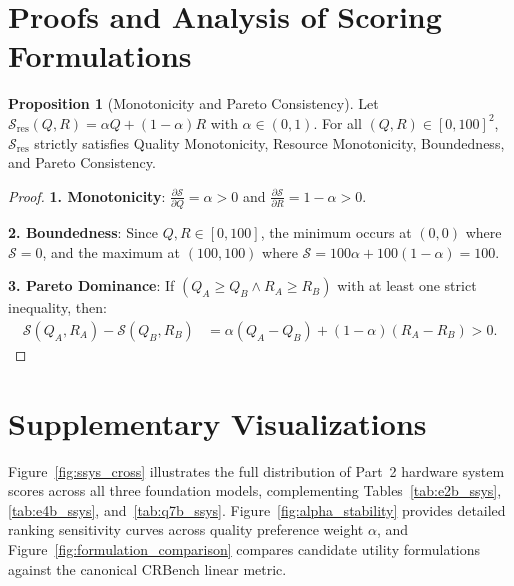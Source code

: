 \documentclass[10pt]{article}
\theoremstyle{definition}
\newtheorem{proposition}{Proposition}
\begin{document}
\section{Proofs and Analysis of Scoring Formulations}
\label{sec:app_proofs}

\begin{proposition}[Monotonicity and Pareto Consistency]
Let $\mathcal{S}_{\text{res}}(Q, R) = \alpha Q + (1-\alpha) R$ with $\alpha \in (0, 1)$. For all $(Q, R) \in [0, 100]^2$, $\mathcal{S}_{\text{res}}$ strictly satisfies Quality Monotonicity, Resource Monotonicity, Boundedness, and Pareto Consistency.
\end{proposition}

\begin{proof}
\textbf{1. Monotonicity}: $\frac{\partial \mathcal{S}}{\partial Q} = \alpha > 0$ and $\frac{\partial \mathcal{S}}{\partial R} = 1-\alpha > 0$.

\textbf{2. Boundedness}: Since $Q, R \in [0, 100]$, the minimum occurs at $(0, 0)$ where $\mathcal{S} = 0$, and the maximum at $(100, 100)$ where $\mathcal{S} = 100\alpha + 100(1-\alpha) = 100$.

\textbf{3. Pareto Dominance}: If $(Q_A \ge Q_B \land R_A \ge R_B)$ with at least one strict inequality, then:
\begin{align}
\mathcal{S}(Q_A, R_A) - \mathcal{S}(Q_B, R_B) &= \alpha(Q_A - Q_B) + (1-\alpha)(R_A - R_B) > 0.
\end{align}
\end{proof}

\clearpage
\section{Supplementary Visualizations}
\label{sec:app_visualizations}

Figure~\ref{fig:ssys_cross} illustrates the full distribution of Part~2 hardware system scores across all three foundation models, complementing Tables~\ref{tab:e2b_ssys}, \ref{tab:e4b_ssys}, and~\ref{tab:q7b_ssys}. Figure~\ref{fig:alpha_stability} provides detailed ranking sensitivity curves across quality preference weight $\alpha$, and Figure~\ref{fig:formulation_comparison} compares candidate utility formulations against the canonical CRBench linear metric.
\end{document}
